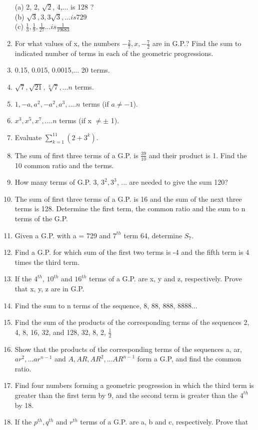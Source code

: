 \begin{enumerate}[label=\arabic*.,ref=\thesubsection.\theenumi]
(a) 2, 2, $\sqrt{2}$, 4,... is 128 ?\\
(b) $\sqrt{3}, 3, 3\sqrt{3},...is 729$\\
(c) $\frac{1}{3}, \frac{1}{9}, \frac{1}{27}...is \frac{1}{19683}$
\item For what values of x, the numbers $-\frac{2}{7}, x, -\frac{7}{2}$ are in G.P.?  Find the sum to indicated number of terms in each of the geometric progressions.
\item 0.15, 0.015, 0.0015,... 20 terms.
\item $\sqrt{7}, \sqrt{21}, \sqrt[3]{7}, ...n$ terms.
\item $1, -a, a^2, -a^2, a^3,.... n$ terms (if $a \neq -1$).
\item $x^3, x^5, x^7,.... n$ terms (if x $\neq \pm$ 1).
\item Evaluate $\sum _{k=1}^{11} (2 + 3^k).$
\item The sum of first three terms of a G.P. is $\frac{39}{10}$ and their product is 1. Find the 10
common ratio and the terms.
\item How many terms of G.P. 3, $3^2, 3^3$, ... are needed to give the sum 120?
\item The sum of first three terms of a G.P. is 16 and the sum of the next three terms is 128. Determine the first term, the common ratio and the sum to n terms of the G.P.
\item Given a G.P. with a = 729 and $7^{th}$ term 64, determine $S_7$.
\item Find a G.P. for which sum of the first two terms is -4 and the fifth term is 4 times the third term.
\item If the $4^{th}$, $10^{th}$ and $16^{th}$ terms of a G.P. are x, y and z, respectively. Prove that x, y, z are in G.P.
\item Find the sum to n terms of the sequence, 8, 88, 888, 8888... 
\item Find the sum of the products of the corresponding terms of the sequences 2, 4, 8, 16, 32, and 128, 32, 8, 2, $\frac{1}{2}$
\item Show that the products of the corresponding terms of the sequences a, ar, $ar^2,...ar^{n-1}$ and $A, AR, AR^2,... AR^{n -1}$ form a G.P, and find the common ratio.
\item Find four numbers forming a geometric progression in which the third term is greater than the first term by 9, and the second term is greater than the $4^{th}$ by 18.
\item If the $p^{th}, q^{th}$ and $r^{th}$ terms of a G.P. are a, b and c, respectively. Prove that 

\end{enumerate}
